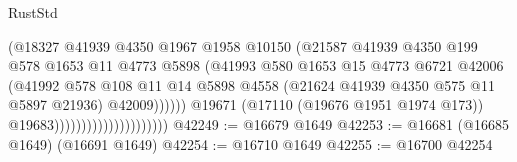 \begin{lexlean}{RustStd}
\begin{coremodule}
                                                  (@18327
                                                    @41939
                                                    @4350
                                                    @1967
                                                    @1958
                                                    @10150
                                                    (@21587
                                                      @41939
                                                      @4350
                                                      @199
                                                      @578
                                                      @1653
                                                      @11
                                                      @4773
                                                      @5898
                                                      (@41993
                                                        @580
                                                        @1653
                                                        @15
                                                        @4773
                                                        @6721
                                                        @42006
                                                        (@41992
                                                          @578
                                                          @108
                                                          @11
                                                          @14
                                                          @5898
                                                          @4558
                                                          (@21624
                                                            @41939
                                                            @4350
                                                            @575
                                                            @11
                                                            @5897
                                                            @21936)
                                                          @42009))))))
                                              @19671
                                              (@17110 (@19676 @1951 @1974 @173))
                                              @19683)))))))))))))))))))))
@42249 := @16679 @1649
@42253 := @16681 (@16685 @1649) (@16691 @1649)
@42254 := @16710 @1649
@42255 := @16700 @42254

\end{coremodule}
\end{lexlean}
